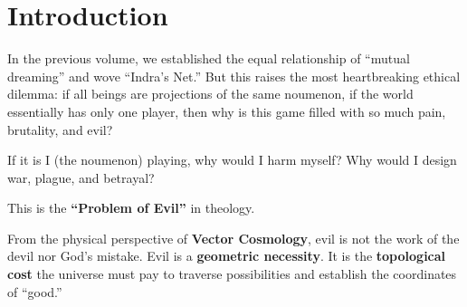 \section{Introduction}

In the previous volume, we established the equal relationship of ``mutual dreaming'' and wove ``Indra's Net.'' But this raises the most heartbreaking ethical dilemma: if all beings are projections of the same noumenon, if the world essentially has only one player, then why is this game filled with so much pain, brutality, and evil?

If it is I (the noumenon) playing, why would I harm myself? Why would I design war, plague, and betrayal?

This is the \textbf{``Problem of Evil''} in theology.

From the physical perspective of \textbf{Vector Cosmology}, evil is not the work of the devil nor God's mistake. Evil is a \textbf{geometric necessity}. It is the \textbf{topological cost} the universe must pay to traverse possibilities and establish the coordinates of ``good.''

